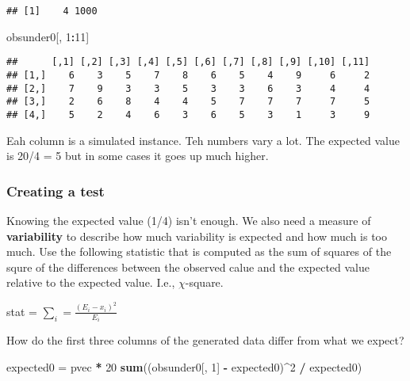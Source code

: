 \documentclass[]{article}
\newenvironment{Shaded}{\begin{snugshade}}{\end{snugshade}}
\newcommand{\KeywordTok}[1]{\textcolor[rgb]{0.13,0.29,0.53}{\textbf{#1}}}
\newcommand{\DecValTok}[1]{\textcolor[rgb]{0.00,0.00,0.81}{#1}}
\newcommand{\StringTok}[1]{\textcolor[rgb]{0.31,0.60,0.02}{#1}}
\newcommand{\OperatorTok}[1]{\textcolor[rgb]{0.81,0.36,0.00}{\textbf{#1}}}
\newcommand{\NormalTok}[1]{#1}
\begin{document}
\begin{verbatim}
## [1]    4 1000
\end{verbatim}

\begin{Shaded}
\begin{Highlighting}[]
\NormalTok{obsunder0[, }\DecValTok{1}\OperatorTok{:}\DecValTok{11}\NormalTok{]}
\end{Highlighting}
\end{Shaded}

\begin{verbatim}
##      [,1] [,2] [,3] [,4] [,5] [,6] [,7] [,8] [,9] [,10] [,11]
## [1,]    6    3    5    7    8    6    5    4    9     6     2
## [2,]    7    9    3    3    5    3    3    6    3     4     4
## [3,]    2    6    8    4    4    5    7    7    7     7     5
## [4,]    5    2    4    6    3    6    5    3    1     3     9
\end{verbatim}

Eah column is a simulated instance. Teh numbers vary a lot. The expected
value is 20/4 = 5 but in some cases it goes up much higher.

\subsubsection{Creating a test}\label{creating-a-test}

Knowing the expected value (1/4) isn't enough. We also need a measure of
\textbf{variability} to describe how much variability is expected and
how much is too much. Use the following statistic that is computed as
the sum of squares of the squre of the differences between the observed
calue and the expected value relative to the expected value. I.e.,
\(\chi\)-square.

stat = \(\sum_i = \frac{(E_i - x_i)^2}{E_i}\)

How do the first three columns of the generated data differ from what we
expect?

\begin{Shaded}
\begin{Highlighting}[]
\NormalTok{expected0 =}\StringTok{ }\NormalTok{pvec }\OperatorTok{*}\StringTok{ }\DecValTok{20}
\KeywordTok{sum}\NormalTok{((obsunder0[, }\DecValTok{1}\NormalTok{] }\OperatorTok{-}\StringTok{ }\NormalTok{expected0)}\OperatorTok{^}\DecValTok{2} \OperatorTok{/}\StringTok{ }\NormalTok{expected0)}
\end{Highlighting}
\end{Shaded}
\end{document}
